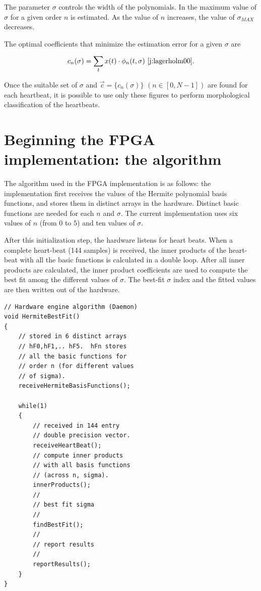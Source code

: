 \documentclass[runningheads]{llncs}
\begin{document}
The parameter $\sigma$ controls the width of the polynomials. In \cite{j:lagerholm00} the maximum value 
of $\sigma$ for a given order $n$ is estimated.  As the value of $n$ increases, the value of $\sigma_{MAX}$ decreases.

The optimal coefficients that minimize the estimation error for a given $\sigma$ are

\begin{equation}\label{eqn:c}
c_n(\sigma)=\sum_{t} x(t)\cdot \phi_n(t,\sigma) \textrm{~\cite{j:lagerholm00}.}
\end{equation}

Once the suitable set of $\sigma$ and $\vec{c}=\{c_n(\sigma)\}$  \mbox{$(n\in [0,N-1])$} are found for each heartbeat, 
it is possible to use only these figures to perform morphological classification of the heartbeats. 

\section{Beginning the FPGA implementation: the algorithm}

The algorithm used in the FPGA implementation is as follows: the 
implementation first receives the values of the Hermite polynomial basis
functions, and  stores them in distinct arrays in the hardware.  Distinct
basic functions are needed for each $n$ and $\sigma$.  The current implementation
uses six values of $n$ (from $0$ to $5$) and ten values of $\sigma$.

After this initialization step, the hardware listens for heart beats. When
a complete heart-beat (144 samples) is received, the inner products of the
heart-beat with all the basic functions is calculated in a double loop.  
After all inner products are calculated, the inner product coefficients
are used to compute the best fit among the different values of $\sigma$.
The best-fit $\sigma$ index and the fitted values are then written
out of the hardware.

\begin{verbatim}
// Hardware engine algorithm (Daemon)
void HermiteBestFit()
{  
    // stored in 6 distinct arrays
    // hF0,hF1,.. hF5.  hFn stores
    // all the basic functions for 
    // order n (for different values
    // of sigma).
    receiveHermiteBasisFunctions();

    while(1)
    {
        // received in 144 entry
        // double precision vector.
        receiveHeartBeat();
        // compute inner products
        // with all basis functions
        // (across n, sigma).
        innerProducts();
        // 
        // best fit sigma
        //
        findBestFit();
        //
        // report results
        //
        reportResults();
    }
}
\end{verbatim}
\end{document}
